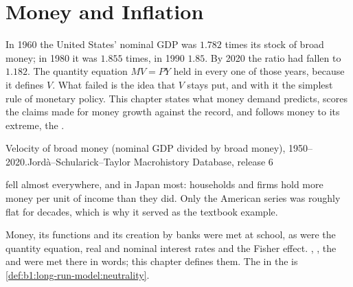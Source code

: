 \chapter{Money and Inflation}\label{ch:b1:money-and-inflation}

In 1960 the United States' nominal GDP was $1.782$ times its stock of broad
money; in 1980 it was $1.855$ times, in 1990 $1.85$. By 2020 the ratio had
fallen to $1.182$. %
The quantity equation $MV = PY$ held in every one of those years, because it
defines $V$. What failed is the idea that $V$ stays put, and with it the
simplest rule of monetary policy. This chapter states what money demand
predicts, scores the claims made for money growth against the record, and
follows money to its extreme, the .

\begin{openingchart}{Velocity of broad money (nominal GDP divided by broad
money), 1950--2020.}{Jord\`a--Schularick--Taylor Macrohistory Database,
release 6}
\end{openingchart}

 fell almost everywhere, and in Japan most: households and firms
hold more money per unit of income than they did. Only the American series
was roughly flat for decades, which is why it served as the textbook
example.

\begin{recall}
Money, its functions and its creation by banks were met at school, as were
the quantity equation, real and nominal interest rates and the Fisher
effect. , , the  and  were
met there in words; this chapter defines them.
The  in the  is
\cref{def:b1:long-run-model:neutrality}.
\end{recall}

